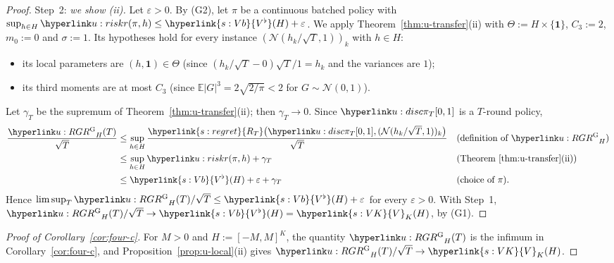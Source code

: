 \documentclass[11pt]{article}
\DeclareRobustCommand{\sy}[2]{{\hyperlink{#1}{#2}}}
\newcommand{\E}{\mathbb{E}}
\newcommand{\1}{\mathbf{1}}
\newcommand{\RT}{\sy{s:regret}{R_T}}
\newcommand{\VK}{\sy{s:VK}{V}}
\newcommand{\Vb}{\sy{s:Vb}{V^\flat}}
\begin{document}
\begin{proof}
Step~2: \emph{we show (ii).} Let $\varepsilon>0$. By (G2), let $\pi$ be a continuous batched policy with $\sup_{h\in H}\urk(\pi,h)\le\Vb(H)+\varepsilon$. We apply
Theorem~\ref{thm:u-transfer}(ii) with $\Theta:=H\times\{\mathbf 1\}$, $C_3:=2$, $m_0:=0$ and $\sigma:=1$. Its hypotheses hold for every instance
$(\mathcal N(h_k/\sqrt T,1))_k$ with $h\in H$:
\begin{itemize}
\item its local parameters are $(h,\mathbf 1)\in\Theta$ (since $(h_k/\sqrt T-0)\sqrt T/1=h_k$ and the variances are $1$);
\item its third moments are at most $C_3$ (since $\E|G|^3=2\sqrt{2/\pi}<2$ for $G\sim\mathcal N(0,1)$).
\end{itemize}
Let $\gamma_T$ be the supremum of Theorem~\ref{thm:u-transfer}(ii); then $\gamma_T\to0$. Since $\uDisc{\pi}{T}{0,1}$ is a $T$-round policy,
\begin{align*}
\frac{\uRG_H(T)}{\sqrt T}&\le\sup_{h\in H}\frac{\RT\big(\uDisc{\pi}{T}{0,1},(\mathcal N(h_k/\sqrt T,1))_k\big)}{\sqrt T} &&\text{(definition of $\uRG_H$)}\\
&\le\sup_{h\in H}\urk(\pi,h)+\gamma_T &&\text{(Theorem~\ref{thm:u-transfer}(ii))}\\
&\le\Vb(H)+\varepsilon+\gamma_T &&\text{(choice of $\pi$)}.
\end{align*}
Hence $\limsup_T\uRG_H(T)/\sqrt T\le\Vb(H)+\varepsilon$ for every $\varepsilon>0$. With Step~1, $\uRG_H(T)/\sqrt T\to\Vb(H)=\VK_K(H)$, by (G1).
\end{proof}

\begin{proof}[Proof of Corollary~\ref{cor:four-c}]
For $M>0$ and $H:=[-M,M]^K$, the quantity $\uRG_H(T)$ is the infimum in Corollary~\ref{cor:four-c}, and Proposition~\ref{prop:u-local}(ii) gives
$\uRG_H(T)/\sqrt T\to\VK_K(H)$.
\end{proof}
\end{document}
